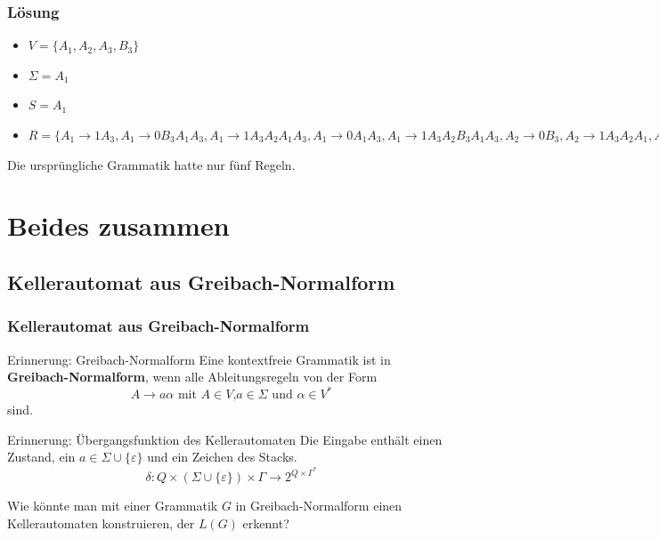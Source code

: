 \begin{frame}
	\frametitle{Lösung}
\begin{itemize}
 \item $V=\{A_1, A_2, A_3, B_3\}$
 \item $\Sigma = A_1$
 \item $S = A_1$
 \item $R = \{A_1 \rightarrow 1A_3, A_1 \rightarrow 0B_3A_1A_3, A_1 \rightarrow 1A_3A_2A_1A_3, A_1 \rightarrow 0A_1A_3, A_1 \rightarrow 1A_3A_2B_3A_1A_3,
 A_2 \rightarrow 0B_3, A_2 \rightarrow 1A_3A_2A_1, A_2 \rightarrow 0A_1, A_2 \rightarrow 1A_3A_2B_3A_1, A_2 \rightarrow 1,
 A_3 \rightarrow 0B_3, A_3 \rightarrow 1A_3A_2B_3, A_3 \rightarrow 1A_3A_2, A_3 \rightarrow 0,
 B_3 \rightarrow 1A_3A_2A_2, B_3 \rightarrow 0B_3A_1A_3A_3A_2, B_3 \rightarrow 1A_3A_2A_1A_3A_3A_2, B_3 \rightarrow 0A_1A_3A_3A_2,
 B_3 \rightarrow 1A_3A_2B_3A_1A_3A_3A_2, B_3 \rightarrow 1A_3A_3A_2B_3, B_3 \rightarrow 0B_3A_1A_3A_3A_2B_3, B_3 \rightarrow 1A_3A_2A_1A_3A_3A_2B_3
 B_3 \rightarrow 0A_1A_3A_3A_2B_3, B_3 \rightarrow 1A_3A_2B_3A_1A_3A_3A_2B_3
 \}$
\end{itemize}
\pause
Die ursprüngliche Grammatik hatte nur fünf Regeln.
\end{frame}

\section{Beides zusammen}
\subsection{Kellerautomat aus Greibach-Normalform}
\begin{frame}
 \frametitle{Kellerautomat aus Greibach-Normalform}
 \begin{block}{Erinnerung: Greibach-Normalform}
  Eine kontextfreie Grammatik ist in \textbf{Greibach-Normalform}, wenn alle Ableitungsregeln von der Form   
  \[ A \rightarrow a\alpha \text{ mit } A \in V\text{,} a\in \Sigma \text{ und } \alpha \in V^*\]
  sind.
 \end{block}
 \pause
 \begin{block}{Erinnerung: Übergangsfunktion des Kellerautomaten}
 Die Eingabe enthält einen Zustand, ein $a \in \Sigma \cup \{\varepsilon\}$ und ein Zeichen des Stacks.
 \[\delta : Q \times ( \Sigma \cup \{\varepsilon\}) \times \Gamma \rightarrow 2^{Q \times \Gamma^*}\]
 \vspace{-0.5cm}
 \end{block}
 \pause
 Wie könnte man mit einer Grammatik $G$ in Greibach-Normalform einen Kellerautomaten konstruieren, der $L(G)$ erkennt?
\end{frame}

